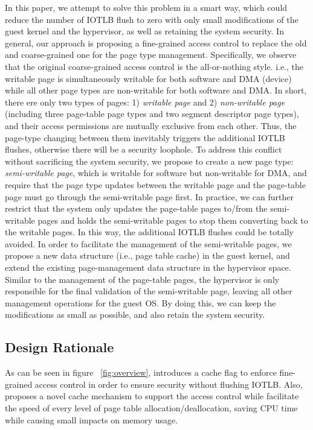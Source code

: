 In this paper, we attempt to solve this problem in a smart way, which could reduce the number of IOTLB flush to zero with only small modifications of the guest kernel and the hypervisor, 
as well as retaining the system security.
In general, our approach is proposing a fine-grained access control to replace the old and coarse-grained one for the page type management.
Specifically, we observe that the original coarse-grained access control is the all-or-nothing style. i.e., the writable page is simultaneously writable for both software and DMA (device) while all other page types are non-writable for both software and DMA.
In short, there ere only two types of pages: 1) \emph{writable page} and 2) \emph{non-writable page} (including three page-table page types and two segment descriptor page types), and their access permissions are mutually exclusive from each other.
Thus, the page-type changing between them inevitably triggers the additional IOTLB flushes, otherwise there will be a security loophole.
To address this conflict without sacrificing the system security, we propose to create a new page type: \emph{semi-writable page}, which is writable for software but non-writable for DMA,
and require that the page type updates between the writable page and the page-table page must go through the semi-writable page first.
In practice,  we can further restrict that the system only updates the page-table pages to/from the semi-writable pages and holds the semi-writable pages to stop them converting back to the writable pages.
In this way, the additional IOTLB flushes could be totally avoided.
In order to facilitate the management of the semi-writable pages, we propose a new data structure (i.e., page table cache) in the guest kernel, and extend the existing page-management data structure in the hypervisor space.
Similar to the management of the page-table pages, the hypervisor is only responsible for the final validation of the semi-writable page, leaving all other management operations for the guest OS.
By doing this, we can keep the modifications as small as possible, and also retain the system security.


\subsection{Design Rationale}
As can be seen in figure ~\ref{fig:overview}, \name introduces a cache flag to enforce fine-grained access control in order to ensure security without flushing IOTLB. Also, \name proposes a novel cache mechanism to support the access control while facilitate the speed of every level of page table allocation/deallocation, saving CPU time while causing small impacts on memory usage.

